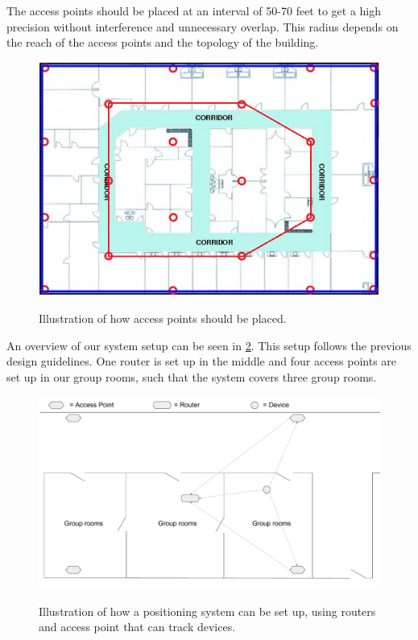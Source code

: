 The access points should be placed at an interval of 50-70 feet to get a high precision without interference and unnecessary overlap\cite{access_point_range}. This radius depends on the reach of the access points and the topology of the building.

\begin{figure}[H]
	\centering
	\includegraphics[scale=0.5]{graphics/access_placement.png}
	\label{fig:access_placement}
	\caption{Illustration of how access points should be placed\cite{access_point_placement}.}
\end{figure}

An overview of our system setup can be seen in \cref{fig:OwnSetup}. This setup follows the previous design guidelines. One router is set up in the middle and four access points are set up in our group rooms, such that the system covers three group rooms.

\begin{figure}[H]
	\centering
	\includegraphics[scale=0.5]{graphics/Router-AccessPoint_Setup.pdf}
	\label{fig:OwnSetup}
	\caption{Illustration of how a positioning system can be set up, using routers and access point that can track devices.}
\end{figure}

